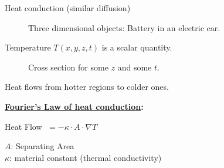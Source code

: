 \documentclass[a4paper,12pt]{report}
\begin{document}
	 Heat conduction (similar diffusion)\\
	\begin{center}
	\begin{figure}[!htb]

	\caption{Three dimensional objects: Battery in an electric car.}\label{fig:Car Battery}
	\end{figure}
	\end{center}
	
	Temperature $T(x,y,z,t)$ is a scalar quantity.
	
	\pagebreak
	
	\begin{center}
	\begin{figure}[!htb]

	\caption{Cross section for some $z$ and some $t$.}\label{fig:Thermals}
	\end{figure}
	\end{center}
	
	Heat flows from hotter regions to colder ones.
	
	\begin{center}
	\fbox
	{
		\parbox{0.7\textwidth}
		{
			\textbf{\underline{Fourier's Law of heat conduction}:}\\
			\begin{center}
 				Heat Flow $\; = - \kappa \cdot A \cdot \nabla T $\\
			\end{center}
			$A$: Separating Area\\
			$ \kappa$: material constant (thermal conductivity)
		}
	}
	\end{center}
	
\end{document}
